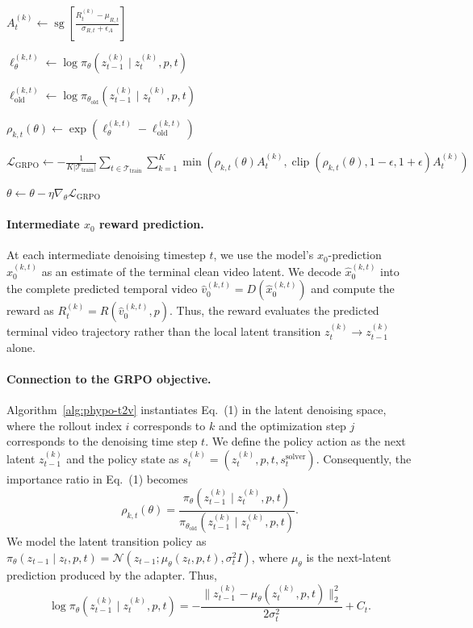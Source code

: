 \documentclass{article}
\begin{document}
\begin{algorithm}[t]
\begin{algorithmic}[1]
        \State \(A_t^{(k)}
        \gets\operatorname{sg}\!\left[
        \frac{R_t^{(k)}-\mu_{R,t}}
        {\sigma_{R,t}+\epsilon_A}
        \right]\)

        \State \(\ell_\theta^{(k,t)}
        \gets\log\pi_\theta
        (z_{t-1}^{(k)}\mid z_t^{(k)},p,t)\)

        \State \(\ell_{\mathrm{old}}^{(k,t)}
        \gets\log\pi_{\theta_{\mathrm{old}}}
        (z_{t-1}^{(k)}\mid z_t^{(k)},p,t)\)

        \State \(\rho_{k,t}(\theta)
        \gets\exp\!\left(
        \ell_\theta^{(k,t)}
        -\ell_{\mathrm{old}}^{(k,t)}
        \right)\)
    \EndFor
\EndFor

\State \(\displaystyle
\mathcal L_{\mathrm{GRPO}}\gets
-\frac{1}{K|\mathcal T_{\mathrm{train}}|}
\sum_{t\in\mathcal T_{\mathrm{train}}}
\sum_{k=1}^K
\min\!\left(
\rho_{k,t}(\theta)A_t^{(k)},
\operatorname{clip}
(\rho_{k,t}(\theta),1-\epsilon,1+\epsilon)
A_t^{(k)}
\right)\)

\State \(\theta\gets
\theta-\eta\nabla_\theta\mathcal L_{\mathrm{GRPO}}\)

\end{algorithmic}
\end{algorithm}
\FloatBarrier
\paragraph{Intermediate $x_0$ reward prediction.}
At each intermediate denoising timestep $t$, we use the model's
$x_0$-prediction $\hat{x}_0^{(k,t)}$ as an estimate of the terminal clean
video latent. We decode $\hat{x}_0^{(k,t)}$ into the complete predicted
temporal video $\hat{v}_0^{(k,t)} = D(\hat{x}_0^{(k,t)})$ and compute the
reward as $R_t^{(k)} = R(\hat{v}_0^{(k,t)}, p)$. Thus, the reward evaluates
the predicted terminal video trajectory rather than the local latent
transition $z_t^{(k)} \rightarrow z_{t-1}^{(k)}$ alone.

\paragraph{Connection to the GRPO objective.}
Algorithm~\ref{alg:phypo-t2v} instantiates Eq.~(1) in the latent
denoising space, where the rollout index $i$ corresponds to $k$ and the optimization
step $j$ corresponds to the denoising time step $t$. We define the policy action
as the next latent $z_{t-1}^{(k)}$ and the policy state as
$s_t^{(k)}=(z_t^{(k)},p,t,s_t^{\mathrm{solver}})$. Consequently, the
importance ratio in Eq.~(1) becomes
\[
\rho_{k,t}(\theta)
=
\frac{
\pi_\theta(z_{t-1}^{(k)} \mid z_t^{(k)},p,t)
}{
\pi_{\theta_{\mathrm{old}}}
(z_{t-1}^{(k)} \mid z_t^{(k)},p,t)
}.
\]
We model the latent transition policy as
$\pi_\theta(z_{t-1}\mid z_t,p,t)
=\mathcal{N}(z_{t-1};\mu_\theta(z_t,p,t),\sigma_t^2 I)$,
where $\mu_\theta$ is the next-latent prediction produced by the adapter.
Thus,
\[
\log \pi_\theta(z_{t-1}^{(k)} \mid z_t^{(k)},p,t)
=
-\frac{
\|z_{t-1}^{(k)}-\mu_\theta(z_t^{(k)},p,t)\|_2^2
}{
2\sigma_t^2
}
+C_t.
\]
\end{document}
